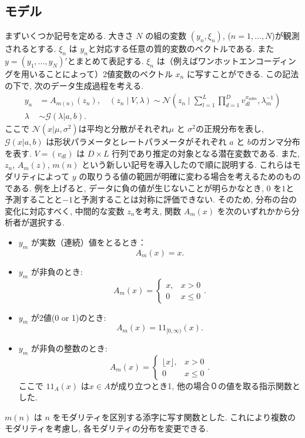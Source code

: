 \documentclass[a4paper,12ptc]{jsarticle} %
\newcommand{\normal}{\mathcal{N}}
\newcommand{\gam}{\mathcal{G}}
\newcommand{\one}{1\!\!1}
\begin{document}
\subsection{モデル}
まずいくつか記号を定める. 大きさ $N$ の組の変数 $(y_n, \xi_n)$, ($n=1,\ldots, N$)が観測されるとする. $\xi_n$ は $y_n$と対応する任意の質的変数のベクトルである. また $y=(y_1, \ldots, y_N)'$とまとめて表記する. 
$\xi_n$ は（例えばワンホットエンコーディングを用いることによって）2値変数のベクトル $x_n$ に写すことができる. この記法の下で, 次のデータ生成過程を考える.
\begin{align}
y_{n} &= A_{m(n)}(z_{n}), \quad (z_{n} \mid V, \lambda) \sim \mathcal{N}\left(z_n \mid \sum_{l=1}^L \prod_{d=1}^Dv_{dl}^{x_{ndm}}, \lambda^{-1}_m\right)  \label{eq_mod1}\\
\lambda & \sim \gam(\lambda | a,b). \nonumber
\end{align}
ここで $\normal(x|\mu,\sigma^2)$は平均と分散がそれぞれ$\mu$ と $\sigma^2$の正規分布を表し, $\gam(x|a,b)$ は形状パラメータとレートパラメータがそれぞれ $a$ と $b$のガンマ分布を表す. $V=(v_{dl})$ は $D \times L$  行列であり推定の対象となる潜在変数である. また, $z_n$, $A_{m}(z)$, $m(n)$ という新しい記号を導入したので順に説明する. これらはモダリティによって $y$ の取りうる値の範囲が明確に変わる場合を考えるためのものである.
例を上げると, データに負の値が生じないことが明らかなとき, $0$ を$1$と予測することと$-1$と予測することは対称に評価できない.
そのため, 分布の台の変化に対応すべく, 中間的な変数 $z_n$を考え, 関数 $A_m(x)$ を次のいずれかから分析者が選択する.
\begin{itemize}
\item $y_m$ が実数（連続）値をとるとき： 
$$
A_m(x)=x.
$$
\item $y_m$ が非負のとき:
$$
A_m(x)=\begin{cases}x, &x>0\\0 &x\leq 0\end{cases}.
$$
\item
$y_m$ が2値(0 or 1)のとき:
$$
A_m(x)=\one_{[0,\infty)}(x).
$$
\item
$y_m$ が非負の整数のとき:
$$
A_m(x)=\begin{cases}\lfloor x\rfloor, & x>0 \\ 
0 &x \leq 0
\end{cases}.
$$
ここで $\one_{A}(x)$ は$x \in A$が成り立つとき1, 他の場合０の値を取る指示関数とした.
\end{itemize}
$m(n)$ は $n$ をモダリティを区別する添字に写す関数とした. これにより複数のモダリティを考慮し, 各モダリティの分布を変更できる.
\end{document}
